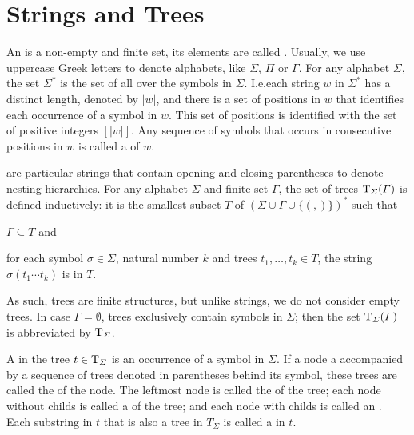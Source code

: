 \documentclass[../document.tex]{subfiles}
\begin{document}
    \section{Strings and Trees}\label{sec:preliminaries:trees}
    An  is a non-empty and finite set, its elements are called .
    Usually, we use uppercase Greek letters to denote alphabets, like \(\varSigma\), \(\varPi\) or \(\varGamma\).
    For any alphabet \(\varSigma\), the set \(\varSigma^*\) is the set of all  over the symbols in \(\varSigma\).
    I.e.\@ each string \(w\) in \(\varSigma^*\) has a distinct length, denoted by \(|w|\), and there is a set of positions in \(w\) that identifies each occurrence of a symbol in \(w\).
    This set of positions is identified with the set of positive integers \([|w|]\).
    Any sequence of symbols that occurs in consecutive positions in \(w\) is called a  of \(w\).

     are particular strings that contain opening and closing parentheses to denote nesting hierarchies.
    For any alphabet \(\varSigma\) and finite set \(\varGamma\), the set of trees \(\operatorname{T}_\varSigma(\varGamma)\) is defined inductively: it is the smallest subset \(T\) of \((\varSigma \cup \varGamma \cup \{ (, )\})^*\) such that
    \begin{inparaenum}[(i)]
        \item \(\varGamma \subseteq T\) and
        \item for each symbol \(\sigma \in \varSigma\), natural number \(k\) and trees \(t_1, \ldots, t_k \in T\), the string \(\sigma(t_1 \cdots t_k)\) is in \(T\).
    \end{inparaenum}
    As such, trees are finite structures, but unlike strings, we do not consider empty trees.
    In case \(\varGamma = \emptyset\), trees exclusively contain symbols in \(\varSigma\); then the set \(\operatorname{T}_\varSigma(\varGamma)\) is abbreviated by \(\operatorname{T}_\varSigma\).

    A  in the tree \(t \in \operatorname{T}_\varSigma\) is an occurrence of a symbol in \(\varSigma\).
    If a node a accompanied by a sequence of trees denoted in parentheses behind its symbol, these trees are called the  of the node.
    The leftmost node is called the  of the tree; each node without \glspl*{child} is called a  of the \gls*{tree}; and each node with \glspl*{child} is called an .
    Each \gls{substring} in \(t\) that is also a \gls*{tree} in \(T_\varSigma\) is called a  in \(t\).
\end{document}

